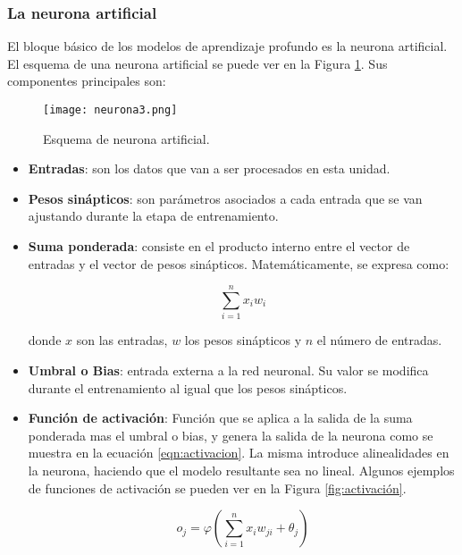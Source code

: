 \subsubsection{La neurona artificial}
El bloque básico de los modelos de aprendizaje profundo es la neurona artificial. El esquema de una neurona artificial se puede ver en la Figura \ref{fig:neurona}. Sus componentes principales son: 

\begin{figure}[H]
  \centering{}
  \texttt{[image: neurona3.png]}
  \caption{Esquema de neurona artificial.}
  \label{fig:neurona}
\end{figure}

\begin{itemize}
    \item \textbf{Entradas}: son los datos que van a ser procesados en esta unidad.
    
    \item \textbf{Pesos sinápticos}: son parámetros asociados a cada entrada que se van ajustando durante la etapa de entrenamiento. 
    
    \item \textbf{Suma ponderada}: consiste en el producto interno entre el vector de entradas y el vector de pesos sinápticos. Matemáticamente, se expresa como:
    
    \begin{equation}
\label{eqn:suma_ponderada}
	\sum_{i=1}^{n}x_{i}w_{i}
\end{equation}
    
    donde $x$ son las entradas, $w$ los pesos sinápticos y $n$ el número de entradas.
	
	\item \textbf{Umbral o Bias}: entrada externa a la red neuronal. Su valor se modifica durante el entrenamiento al igual que los pesos sinápticos.     
    
    \item \textbf{Función de activación}: Función que se aplica a la salida de la suma ponderada mas el umbral o bias, y genera la salida de la neurona como se muestra en la ecuación \ref{eqn:activacion}. La misma introduce alinealidades en la neurona, haciendo que el modelo resultante sea no lineal. Algunos ejemplos de funciones de activación se pueden ver en la Figura \ref{fig:activación}. 
    
\begin{equation}
\label{eqn:activacion}
	o_{j} = \varphi (\sum_{i=1}^{n}x_{i}w_{ji}+\theta_{j})
\end{equation}
     
\end{itemize}


